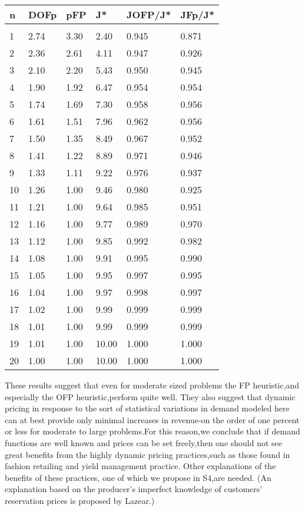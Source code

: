 \begin{longtable}[]{@{}|l|l|l|l|l|l|@{}}
\toprule\noalign{}
\endhead
\bottomrule\noalign{}
\endlastfoot
\hline
n & DOFp & pFP & J* & JOFP/J* & JFp/J* \\
\hline
& & & & & \\
\hline
1 & 2.74 & 3.30 & 2.40 & 0.945 & 0.871 \\
\hline
2 & 2.36 & 2.61 & 4.11 & 0.947 & 0.926 \\
\hline
3 & 2.10 & 2.20 & 5.43 & 0.950 & 0.945 \\
\hline
4 & 1.90 & 1.92 & 6.47 & 0.954 & 0.954 \\
\hline
5 & 1.74 & 1.69 & 7.30 & 0.958 & 0.956 \\
\hline
6 & 1.61 & 1.51 & 7.96 & 0.962 & 0.956 \\
\hline
7 & 1.50 & 1.35 & 8.49 & 0.967 & 0.952 \\
\hline
8 & 1.41 & 1.22 & 8.89 & 0.971 & 0.946 \\
\hline
9 & 1.33 & 1.11 & 9.22 & 0.976 & 0.937 \\
\hline
10 & 1.26 & 1.00 & 9.46 & 0.980 & 0.925 \\
\hline
11 & 1.21 & 1.00 & 9.64 & 0.985 & 0.951 \\
\hline
12 & 1.16 & 1.00 & 9.77 & 0.989 & 0.970 \\
\hline
13 & 1.12 & 1.00 & 9.85 & 0.992 & 0.982 \\
\hline
14 & 1.08 & 1.00 & 9.91 & 0.995 & 0.990 \\
\hline
15 & 1.05 & 1.00 & 9.95 & 0.997 & 0.995 \\
\hline
16 & 1.04 & 1.00 & 9.97 & 0.998 & 0.997 \\
\hline
17 & 1.02 & 1.00 & 9.99 & 0.999 & 0.999 \\
\hline
18 & 1.01 & 1.00 & 9.99 & 0.999 & 0.999 \\
\hline
19 & 1.01 & 1.00 & 10.00 & 1.000 & 1.000 \\
\hline
20 & 1.00 & 1.00 & 10.00 & 1.000 & 1.000 \\
\hline
\end{longtable}

These results suggest that even for moderate sized problems the FP
heuristic,and especially the OFP heuristic,perform quite well. They also
suggest that dynamic pricing in response to the sort of statistical
variations in demand modeled here can at best provide only minimal
increases in revenue-on the order of one percent or less for moderate to
large problems.For this reason,we conclude that if demand functions are
well known and prices can be set freely,then one should not see great
benefits from the highly dynamic pricing practices,such as those found
in fashion retailing and yield management practice. Other explanations
of the benefits of these practices, one of which we propose in S4,are
needed. (An explanation based on the producer's imperfect knowledge of
customers' reservation prices is proposed by Lazear.)

